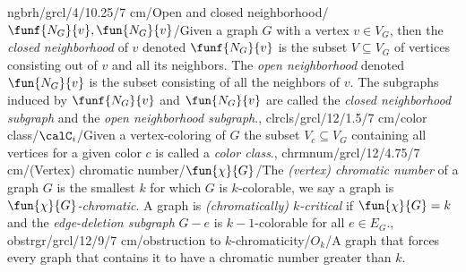 ngbrh/grcl/4/10.25/7 cm/{Open and closed neighborhood}/{$\funf{N_G}{v},\fun{N_G}{v}$}/{Given a graph $G$ with a vertex $v\in V_G$, then the \emph{closed neighborhood} of $v$ denoted $\funf{N_G}{v}$ is the subset $V\subseteq V_G$ of vertices consisting out of $v$ and all its neighbors. The \emph{open neighborhood} denoted $\fun{N_G}{v}$ is the subset consisting of all the neighbors of $v$. The subgraphs induced by $\funf{N_G}{v}$ and $\fun{N_G}{v}$ are called the \emph{closed neighborhood subgraph} and the \emph{open neighborhood subgraph}.},
clrcls/grcl/12/1.5/7 cm/{color class}/{$\calC_i$}/{Given a vertex-coloring of $G$ the subset $V_c\subseteq V_G$ containing all vertices for a given color $c$ is called a \emph{color class}.},
chrmnum/grcl/12/4.75/7 cm/{(Vertex) chromatic number}/{$\fun{\chi}{G}$}/{The \emph{(vertex) chromatic number} of a graph $G$ is the smallest $k$ for which $G$ is $k$-colorable, we say a graph is \emph{$\fun{\chi}{G}$-chromatic}. A graph is \emph{(chromatically) $k$-critical} if $\fun{\chi}{G}=k$ and the \emph{edge-deletion subgraph} $G-e$ is $k-1$-colorable for all $e\in E_G$.},
obstrgr/grcl/12/9/7 cm/{obstruction to $k$-chromaticity}/{$O_k$}/{A graph that forces every graph that contains it to have a chromatic number greater than $k$.}